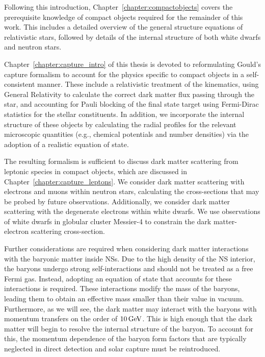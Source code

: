 Following this introduction, Chapter~\ref{chapter:compactobjects} covers the prerequisite knowledge of compact objects
required for the remainder of this work. This includes a detailed overview of the general structure equations of relativistic stars, followed by details of the internal structure of both white dwarfs and neutron stars. 

Chapter~\ref{chapter:capture_intro} of this thesis is devoted to reformulating Gould's capture formalism to account for the physics specific to compact objects in a self-consistent manner. These include a relativistic treatment of the kinematics, using General Relativity to calculate the correct dark matter flux passing through the star, and accounting for Pauli blocking of the final state target using Fermi-Dirac statistics for the stellar constituents. In addition, we incorporate the internal structure of these objects by calculating the radial profiles for the relevant microscopic quantities (e.g., chemical potentials and number densities) via the adoption of a realistic equation of state.

The resulting formalism is sufficient to discuss dark matter scattering from leptonic species in compact objects, which are discussed in Chapter~\ref{chapter:capture_leptons}. We consider dark matter scattering with electrons and muons within neutron stars, calculating the cross-sections that may be probed by future observations. Additionally, we consider dark matter scattering with the degenerate electrons within white dwarfs. We use observations of white dwarfs in globular cluster Messier-4 to constrain the dark matter-electron scattering cross-section.

Further considerations are required when considering dark matter interactions with the baryonic matter inside NSs. Due to the high density of the NS interior, the baryons undergo strong self-interactions and should not be treated as a free Fermi gas. Instead, adopting an equation of state that accounts for these interactions is required. These interactions modify the mass of the baryons, leading them to obtain an effective mass smaller than their value in vacuum. Furthermore, as we will see, the dark matter may interact with the baryons with momentum transfers on the order of $10{\rm \,GeV}$. This is high enough that the dark matter will begin to resolve the internal structure of the baryon. To account for this, the momentum dependence of the baryon form factors that are typically neglected in direct detection and solar capture must be reintroduced.

